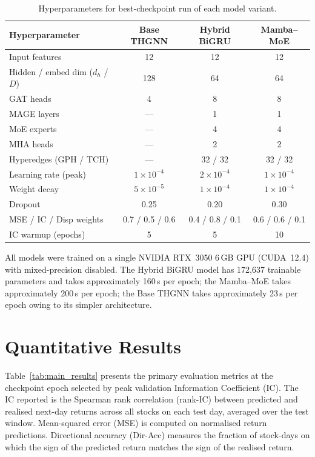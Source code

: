 \documentclass[a4paper,11pt]{report}
\begin{document}
\begin{table}[htbp]
\centering
\caption{Hyperparameters for best-checkpoint run of each model variant.}
\label{tab:hyperparams}
\begin{tabular}{lccc}
\toprule
\textbf{Hyperparameter} & \textbf{Base THGNN} & \textbf{Hybrid BiGRU} & \textbf{Mamba--MoE} \\
\midrule
Input features & 12 & 12 & 12 \\
Hidden / embed dim ($d_h$ / $D$) & 128 & 64 & 64 \\
GAT heads & 4 & 8 & 8 \\
MAGE layers & --- & 1 & 1 \\
MoE experts & --- & 4 & 4 \\
MHA heads & --- & 2 & 2 \\
Hyperedges (GPH / TCH) & --- & 32 / 32 & 32 / 32 \\
Learning rate (peak) & $1\times10^{-4}$ & $2\times10^{-4}$ & $1\times10^{-4}$ \\
Weight decay & $5\times10^{-5}$ & $1\times10^{-4}$ & $1\times10^{-4}$ \\
Dropout & 0.25 & 0.20 & 0.30 \\
MSE / IC / Disp weights & 0.7 / 0.5 / 0.6 & 0.4 / 0.8 / 0.1 & 0.6 / 0.6 / 0.1 \\
IC warmup (epochs) & 5 & 5 & 10 \\
\bottomrule
\end{tabular}
\end{table}

All models were trained on a single NVIDIA RTX~3050 6\,GB GPU (CUDA~12.4) with mixed-precision disabled. The Hybrid BiGRU model has 172,637 trainable parameters and takes approximately 160\,s per epoch; the Mamba--MoE takes approximately 200\,s per epoch; the Base THGNN takes approximately 23\,s per epoch owing to its simpler architecture.

\section{Quantitative Results}

Table~\ref{tab:main_results} presents the primary evaluation metrics at the checkpoint epoch selected by peak validation Information Coefficient (IC). The IC reported is the Spearman rank correlation (rank-IC) between predicted and realised next-day returns across all stocks on each test day, averaged over the test window. Mean-squared error (MSE) is computed on normalised return predictions. Directional accuracy (Dir-Acc) measures the fraction of stock-days on which the sign of the predicted return matches the sign of the realised return.
\end{document}
